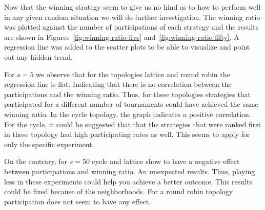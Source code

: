 Now that the winning strategy seem to give us no hind as to how to perform
well in any given random situation we will do further investigation.
The winning ratio was plotted against the number of participations of each
strategy and the results are shown in Figures~\ref{fig:winning-ratio-five}
and~\ref{fig:winning-ratio-fifty}. A regression line was added to the scatter plots
to be able to visualize and point out any hidden trend.

For \(s=5\) we observe that for the topologies lattice and round robin
the regression line is flat. Indicating that there is no correlation between the
participations and the winning ratio. Thus, for these topologies strategies
that participated for a different number of tournaments could have achieved the
same winning ratio. In the cycle topology, the graph indicates a positive
correlation. For the cycle,
it could be suggested that that the strategies that were ranked first in these
topology had high
participating rates as well. This seems to apply for only the specific experiment.

On the contrary, for \(s=50\) cycle and lattice show to have a negative
effect between participations and winning ratio. An unexpected results. Thus, playing
less in these experiments could help you achieve a better outcome. This results
could be fixed because of the neighborhoods. For a round robin topology
participation does not seem to have any effect.

